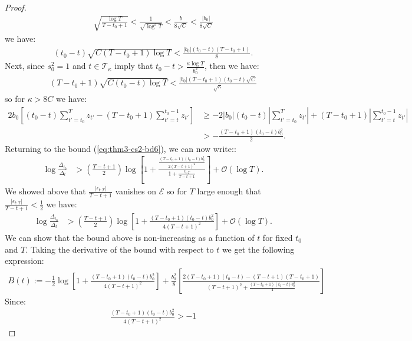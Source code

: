 \begin{proof}
\begin{align*}
    \sqrt{\frac{\log T}{T-t_0+1}} < \frac{1}{\sqrt{\log^{\varepsilon} T}} < \frac{\underline{b}}{8\sqrt{C}} < \frac{|b_0|}{8 \sqrt{C}}
\end{align*}
we have:
\begin{align*}
    (t_0-t)\sqrt{C(T-t_0+1)\log T} < \frac{|b_0|(t_0 - t)(T-t_0+1)}{8}.
\end{align*}
Next, since $s_0^2 = 1$ and $t \in \mathcal{T}_\kappa$ imply that $t_0 - t > \frac{\kappa\log T}{b_0^2}$, then we have:
\begin{align*}
    (T-t_0+1)\sqrt{C(t_0-t)\log T} < \frac{|b_0|(T-t_0+1)(t_0 -t)\sqrt{C}}{\sqrt{\kappa}}
\end{align*}
so for $\kappa > 8C$ we have: 
\begin{align*}
    2b_0\left[(t_0-t)\sum_{t'=t_0}^{T} z_{t'} - (T-t_0+1)\sum_{t'=t}^{t_0-1} z_{t'}\right] &\geq - 2|b_0|(t_0-t)\left|\sum_{t'=t_0}^{T} z_{t'}\right| + (T-t_0+1)\left|\sum_{t'=t}^{t_0-1} z_{t'}\right| \\
    &> - \frac{(T-t_0+1)(t_0-t)b_0^2}{2}.
\end{align*}
Returning to the bound (\ref{eq:thm3-cs2-bd6}), we can now write::
\begin{align*}
    \log \frac{\Delta_{t_0}}{\Delta_t} &> \left(\frac{T - t +1}{2}\right)\log\left[1 +\frac{\frac{(T-t_0+1)(t_0-t)b_0^2}{2(T-t+1)^2}}{1 + \frac{\epsilon_{t:T}}{T-t+1}} \right] + \mathcal{O}(\log T).
\end{align*}
We showed above that $\frac{|\epsilon_{t:T}|}{T-t+1}$ vanishes on $\mathcal{E}$ so for $T$ large enough that $\frac{|\epsilon_{t:T}|}{T-t+1} < \frac{1}{2}$ we have:
\begin{align}
    \log \frac{\Delta_{t_0}}{\Delta_t} &> \left(\frac{T - t +1}{2}\right)\log\left[1 +\frac{(T-t_0+1)(t_0-t)b_0^2}{4(T-t+1)^2} \right] + \mathcal{O}(\log T). \label{eq:thm3-cs2-bd7}
\end{align}
We can show that the bound above is non-increasing as a function of $t$ for fixed $t_0$ and $T$. Taking the derivative of the bound with respect to $t$ we get the following expression: 
\begin{align}
    B(t) := -\frac{1}{2}\log\left[1 +\frac{(T-t_0+1)(t_0-t)b_0^2}{4(T-t+1)^2} \right] + \frac{b_0^2}{8}\left[\frac{2(T-t_0+1)(t_0-t)-(T-t+1)(T-t_0+1)}{(T-t+1)^2 +\frac{(T-t_0+1)(t_0-t)b_0^2}{4}}\right] \label{eq:thm3-cs2-derivative2}
\end{align}
Since: 
\begin{align*}
    \frac{(T-t_0+1)(t_0-t)b_0^2}{4(T-t+1)^2} > -1
\end{align*}

\end{proof}
